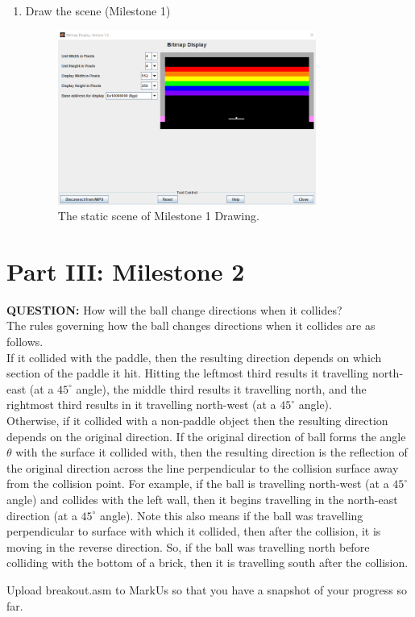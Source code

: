 \documentclass{article}
\begin{document}
\begin{enumerate}
\item Draw the scene (Milestone 1)

\begin{figure}[ht!]
    \centering
    \includegraphics[width=0.8\textwidth]{milestone1_drawing.png}
    \caption{The static scene of Milestone 1 Drawing.}
    \label{f:milestone1_drawing}
\end{figure}

\end{enumerate}

\section{Part III: Milestone 2}

\item \textbf{QUESTION: } How will the ball change directions when it collides? \\[0.4em]
The rules governing how the ball changes directions when it collides are as follows. \\[0.4em]
If it collided with the paddle, then the resulting direction depends on which section of the paddle it hit.
Hitting the leftmost third results it travelling north-east (at a $45^\circ$ angle), the middle third results it travelling north, and the rightmost third results in it travelling north-west (at a $45^\circ$ angle). \\[0.4em]
Otherwise, if it collided with a non-paddle object then the resulting direction depends on the original direction.
If the original direction of ball forms the angle $\theta$ with the surface it collided with, 
then the resulting direction is the reflection of the original direction across the line perpendicular to the collision surface away from the collision point.
For example, if the ball is travelling north-west (at a $45^\circ$ angle) and collides with the left wall, then it begins travelling in the north-east direction (at a $45^\circ$ angle).
Note this also means if the ball was travelling perpendicular to surface with which it collided, then after the collision, it is moving in the reverse direction.
So, if the ball was travelling north before colliding with the bottom of a brick, then it is travelling south after the collision.
\item Upload breakout.asm to MarkUs so that you have a snapshot of your progress so far.
\end{document}
